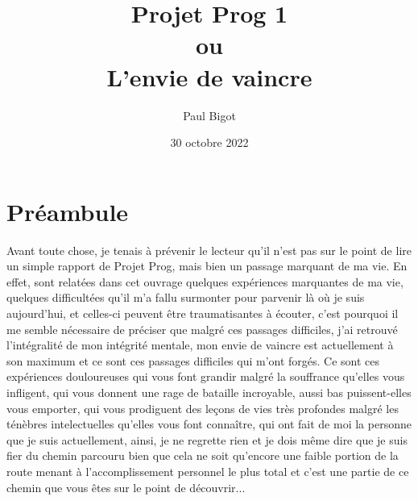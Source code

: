 \documentclass{report}
\title{Projet Prog 1\\ou\\L'envie de vaincre}
\author{Paul Bigot}
\date{30 octobre 2022}
\begin{document}
\maketitle
\section{Préambule}
Avant toute chose, je tenais à prévenir le lecteur qu'il n'est pas sur le point de lire un simple rapport de Projet Prog, mais bien un passage marquant de ma vie. En effet, sont relatées dans cet ouvrage quelques expériences marquantes de ma vie, quelques difficultées qu'il m'a fallu surmonter pour parvenir là où je suis aujourd'hui, et celles-ci peuvent être traumatisantes à écouter, c'est pourquoi il me semble nécessaire de préciser que malgré ces passages difficiles, j'ai retrouvé l'intégralité de mon intégrité mentale, mon envie de vaincre est actuellement à son maximum et ce sont ces passages difficiles qui m'ont forgés. Ce sont ces expériences douloureuses qui vous font grandir malgré la souffrance qu'elles vous infligent, qui vous donnent une rage de bataille incroyable, aussi bas puissent-elles vous emporter, qui vous prodiguent des leçons de vies très profondes malgré les ténèbres intelectuelles qu'elles vous font connaître, qui ont fait de moi la personne que je suis actuellement, ainsi, je ne regrette rien et je dois même dire que je suis fier du chemin parcouru bien que cela ne soit qu'encore une faible portion de la route menant à l'accomplissement personnel le plus total et c'est une partie de ce chemin que vous êtes sur le point de découvrir...
\end{document}
